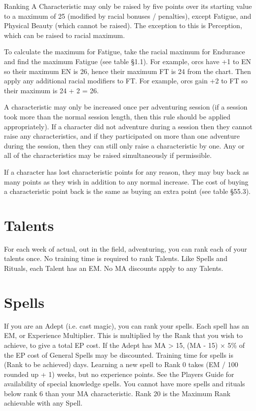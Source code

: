 \begin{Chapter}{Ranking}
A Characteristic may only be raised by five points over its starting
value to a maximum of 25 (modified by racial bonuses / penalties),
except Fatigue, and Physical Beauty (which cannot be raised). The
exception to this is Perception, which can be raised to racial
maximum.

To calculate the maximum for Fatigue, take the racial maximum for
Endurance and find the maximum Fatigue (see table §1.1).  For example,
orcs have +1 to EN so their maximum EN is 26, hence their maximum FT
is 24 from the chart. Then apply any additional racial modifiers to
FT. For example, orcs gain +2 to FT so their maximum is 24 + 2 = 26.

A characteristic may only be increased once per adventuring session
(if a session took more than the normal session length, then this rule
should be applied appropriately). If a character did not adventure
during a session then they cannot raise any characteristics, and if
they participated on more than one adventure during the session, then
they can still only raise a characteristic by one.  Any or all of the
characteristics may be raised simultaneously if permissible.

If a character has lost characteristic points for any reason, they may
buy back as many points as they wish in addition to any normal
increase. The cost of buying a characteristic point back is the same
as buying an extra point (see table §55.3).

\section{Talents}

For each week of actual, out in the field, adventuring, you can rank
each of your talents once.  No training time is required to rank
Talents.  Like Spells and Rituals, each Talent has an EM. No MA
discounts apply to any Talents.

\section{Spells}

If you are an Adept (i.e. cast magic), you can rank your spells.  Each
spell has an EM, or Experience Multiplier. This is multiplied by the
Rank that you wish to achieve, to give a total EP cost.  If the Adept
has MA > 15, (MA - 15) × 5\% of the EP cost of General Spells may be
discounted. Training time for spells is (Rank to be achieved) days.
Learning a new spell to Rank 0 takes (EM / 100 rounded up + 1) weeks,
but no experience points.  See the Players Guide for availability of
special knowledge spells.  You cannot have more spells and rituals
below rank 6 than your MA characteristic. Rank 20 is the Maximum
Rank achievable with any Spell.


\end{Chapter}
